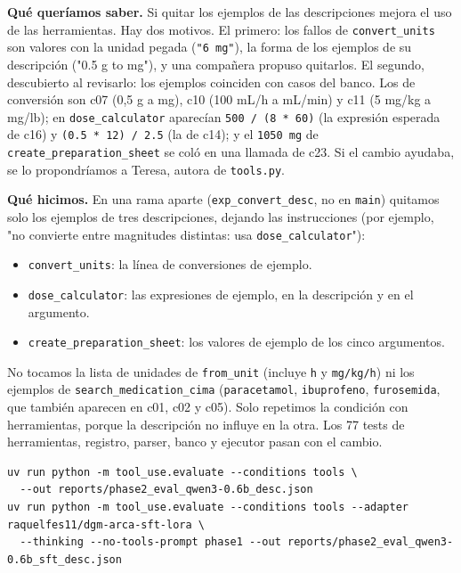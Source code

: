 \textbf{Qué queríamos saber.} Si quitar los ejemplos de las descripciones mejora el uso de las
herramientas. Hay dos motivos. El primero: los fallos de \texttt{convert\_\allowbreak{}units} son valores con la unidad
pegada (\texttt{"6 mg"}), la forma de los ejemplos de su descripción ("0.5 g to mg"), y una compañera
propuso quitarlos. El segundo, descubierto al revisarlo: los ejemplos coinciden con casos del banco.
Los de conversión son c07 (0,5 g a mg), c10 (100 mL/h a mL/min) y c11 (5 mg/kg a mg/lb); en
\texttt{dose\_\allowbreak{}calculator} aparecían \texttt{500 /\allowbreak{} (8 * 60)} (la expresión esperada de c16) y \texttt{(0.5 * 12) /\allowbreak{} 2.5}
(la de c14); y el \texttt{1050 mg} de \texttt{create\_\allowbreak{}preparation\_\allowbreak{}sheet} se coló en una llamada de c23. Si el
cambio ayudaba, se lo propondríamos a Teresa, autora de \texttt{tools.py}.

\textbf{Qué hicimos.} En una rama aparte (\texttt{exp\_\allowbreak{}convert\_\allowbreak{}desc}, no en \texttt{main}) quitamos solo los ejemplos de
tres descripciones, dejando las instrucciones (por ejemplo, "no convierte entre magnitudes
distintas: usa \texttt{dose\_\allowbreak{}calculator}"):

\begin{itemize}
\tightlist
\item
  \texttt{convert\_\allowbreak{}units}: la línea de conversiones de ejemplo.
\item
  \texttt{dose\_\allowbreak{}calculator}: las expresiones de ejemplo, en la descripción y en el argumento.
\item
  \texttt{create\_\allowbreak{}preparation\_\allowbreak{}sheet}: los valores de ejemplo de los cinco argumentos.
\end{itemize}

No tocamos la lista de unidades de \texttt{from\_\allowbreak{}unit} (incluye \texttt{\textquotesingle{}h\textquotesingle{}} y \texttt{\textquotesingle{}mg/\allowbreak{}kg/\allowbreak{}h\textquotesingle{}}) ni los ejemplos de
\texttt{search\_\allowbreak{}medication\_\allowbreak{}cima} (\texttt{paracetamol}, \texttt{ibuprofeno}, \texttt{furosemida}, que también aparecen en c01,
c02 y c05). Solo repetimos la condición con herramientas, porque la descripción no influye en la
otra. Los 77 tests de herramientas, registro, parser, banco y ejecutor pasan con el cambio.

\begin{lstlisting}
uv run python -m tool_use.evaluate --conditions tools \
  --out reports/phase2_eval_qwen3-0.6b_desc.json
uv run python -m tool_use.evaluate --conditions tools --adapter raquelfes11/dgm-arca-sft-lora \
  --thinking --no-tools-prompt phase1 --out reports/phase2_eval_qwen3-0.6b_sft_desc.json
\end{lstlisting}

